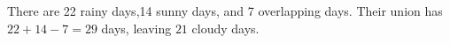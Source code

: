 There are 22 rainy days,14 sunny days, and 7 overlapping days. Their union has $22+14-7=29$ days, leaving $\boxed{21}$ cloudy days.
